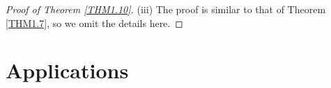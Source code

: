 \documentclass[11pt,reqno]{amsart}
\numberwithin{equation}{section}
\begin{document}
\begin{proof}[Proof of Theorem \ref{THM1.10}]



(iii)
The proof is similar to that of Theorem \ref{THM1.7}, so we omit the details here.
\end{proof}





\section{Applications }
\end{document}
